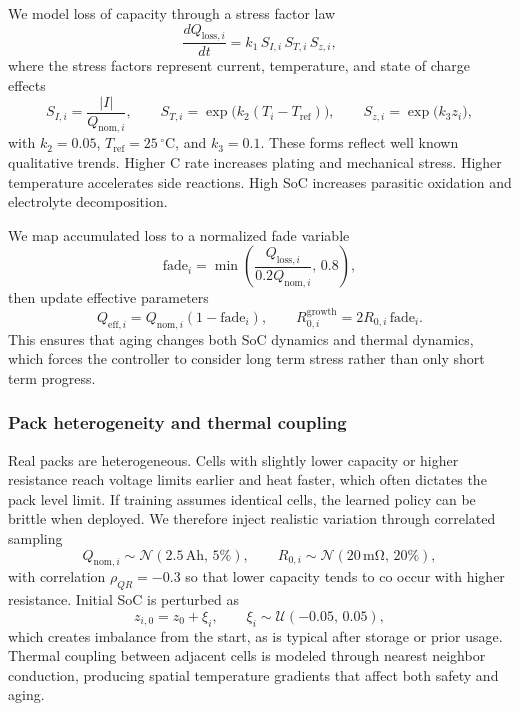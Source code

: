 \documentclass[%
 aip,
 amsmath,amssymb,
reprint, onecolumn %
]{revtex4-1}
\begin{document}
We model loss of capacity through a stress factor law
\begin{equation}
\frac{dQ_{\mathrm{loss},i}}{dt} = k_1\,S_{I,i}\,S_{T,i}\,S_{z,i},
\end{equation}
where the stress factors represent current, temperature, and state of charge effects
\begin{equation}
S_{I,i} = \frac{|I|}{Q_{\mathrm{nom},i}},
\qquad
S_{T,i} = \exp\!\big(k_2 (T_i - T_{\mathrm{ref}})\big),
\qquad
S_{z,i} = \exp\!\big(k_3 z_i\big),
\end{equation}
with $k_2 = 0.05$, $T_{\mathrm{ref}}=25\,^{\circ}\mathrm{C}$, and $k_3 = 0.1$. These forms reflect well known qualitative trends. Higher C rate increases plating and mechanical stress. Higher temperature accelerates side reactions. High SoC increases parasitic oxidation and electrolyte decomposition.

We map accumulated loss to a normalized fade variable
\begin{equation}
\mathrm{fade}_i = \min\!\left(\frac{Q_{\mathrm{loss},i}}{0.2 Q_{\mathrm{nom},i}},\,0.8\right),
\end{equation}
then update effective parameters
\begin{equation}
Q_{\mathrm{eff},i} = Q_{\mathrm{nom},i}(1-\mathrm{fade}_i),
\qquad
R_{0,i}^{\mathrm{growth}} = 2 R_{0,i}\,\mathrm{fade}_i.
\end{equation}
This ensures that aging changes both SoC dynamics and thermal dynamics, which forces the controller to consider long term stress rather than only short term progress.

\subsubsection{Pack heterogeneity and thermal coupling}
Real packs are heterogeneous. Cells with slightly lower capacity or higher resistance reach voltage limits earlier and heat faster, which often dictates the pack level limit. If training assumes identical cells, the learned policy can be brittle when deployed. We therefore inject realistic variation through correlated sampling
\begin{equation}
Q_{\mathrm{nom},i} \sim \mathcal{N}\!\left(2.5\,\mathrm{Ah},\,5\%\right),
\qquad
R_{0,i} \sim \mathcal{N}\!\left(20\,\mathrm{m\Omega},\,20\%\right),
\end{equation}
with correlation $\rho_{QR}=-0.3$ so that lower capacity tends to co occur with higher resistance. Initial SoC is perturbed as
\begin{equation}
z_{i,0} = z_{0} + \xi_i,
\qquad
\xi_i \sim \mathcal{U}(-0.05,\,0.05),
\end{equation}
which creates imbalance from the start, as is typical after storage or prior usage. Thermal coupling between adjacent cells is modeled through nearest neighbor conduction, producing spatial temperature gradients that affect both safety and aging.
\end{document}
